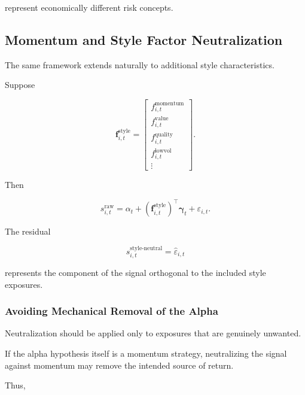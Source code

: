 \documentclass[11pt,a4paper]{article}
\begin{document}
represent economically different risk concepts.


\subsection{Momentum and Style Factor Neutralization}
\label{subsec:style_neutralization}

The same framework extends naturally to additional style characteristics.

Suppose

\begin{equation}
\mathbf{f}_{i,t}^{\mathrm{style}}
=
\begin{bmatrix}
f_{i,t}^{\mathrm{momentum}}
\\
f_{i,t}^{\mathrm{value}}
\\
f_{i,t}^{\mathrm{quality}}
\\
f_{i,t}^{\mathrm{lowvol}}
\\
\vdots
\end{bmatrix}.
\end{equation}

Then

\begin{equation}
s_{i,t}^{\mathrm{raw}}
=
\alpha_t
+
\left(
\mathbf{f}_{i,t}^{\mathrm{style}}
\right)^\top
\boldsymbol{\gamma}_t
+
\varepsilon_{i,t}.
\end{equation}

The residual

\begin{equation}
\boxed{
s_{i,t}^{\mathrm{style\text{-}neutral}}
=
\widehat{\varepsilon}_{i,t}
}
\end{equation}

represents the component of the signal orthogonal to the included style
exposures.


\subsubsection{Avoiding Mechanical Removal of the Alpha}

Neutralization should be applied only to exposures that are genuinely unwanted.

If the alpha hypothesis itself is a momentum strategy, neutralizing the signal
against momentum may remove the intended source of return.

Thus,
\end{document}
